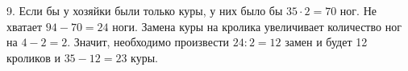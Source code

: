 9. Если бы у хозяйки были только куры, у них было бы $35\cdot2=70$ ног. Не хватает $94-70=24$ ноги. Замена куры на кролика увеличивает количество ног на $4-2=2.$ Значит, необходимо произвести $24:2=12$ замен и будет 12 кроликов и $35-12=23$ куры.\\
